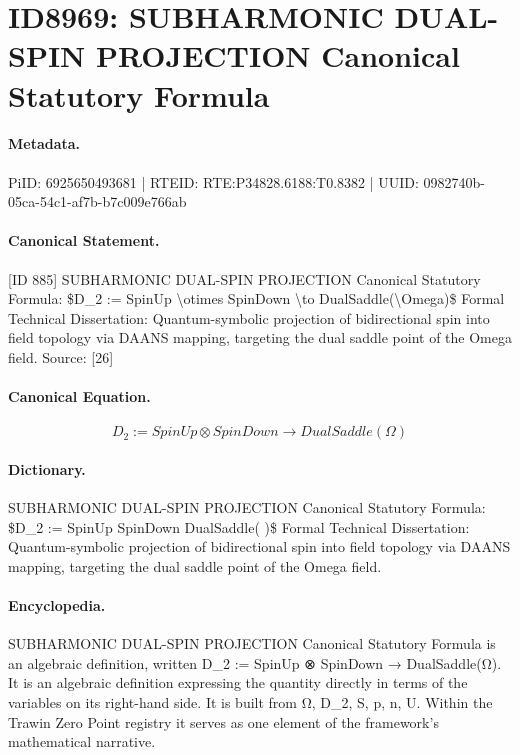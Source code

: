 \section*{ID8969: SUBHARMONIC DUAL-SPIN PROJECTION Canonical Statutory Formula}
\paragraph{Metadata.}
PiID: 6925650493681 | RTEID: RTE:P34828.6188:T0.8382 | UUID: 0982740b-05ca-54c1-af7b-b7c009e766ab

\paragraph{Canonical Statement.}
[ID 885] SUBHARMONIC DUAL-SPIN PROJECTION Canonical Statutory Formula: \$D\_2 := SpinUp \textbackslash{}otimes SpinDown \textbackslash{}to DualSaddle(\textbackslash{}Omega)\$ Formal Technical Dissertation: Quantum-symbolic projection of bidirectional spin into field topology via DAANS mapping, targeting the dual saddle point of the Omega field. Source: [26]

\paragraph{Canonical Equation.}
\[
D_2 := SpinUp \otimes SpinDown \to DualSaddle(\Omega)
\]

\paragraph{Dictionary.}
SUBHARMONIC DUAL-SPIN PROJECTION Canonical Statutory Formula: \$D\_2 := SpinUp SpinDown DualSaddle( )\$ Formal Technical Dissertation: Quantum-symbolic projection of bidirectional spin into field topology via DAANS mapping, targeting the dual saddle point of the Omega field.

\paragraph{Encyclopedia.}
SUBHARMONIC DUAL-SPIN PROJECTION Canonical Statutory Formula is an algebraic definition, written D\_2 := SpinUp ⊗ SpinDown → DualSaddle(Ω). It is an algebraic definition expressing the quantity directly in terms of the variables on its right-hand side. It is built from Ω, D\_2, S, p, n, U. Within the Trawin Zero Point registry it serves as one element of the framework's mathematical narrative.
